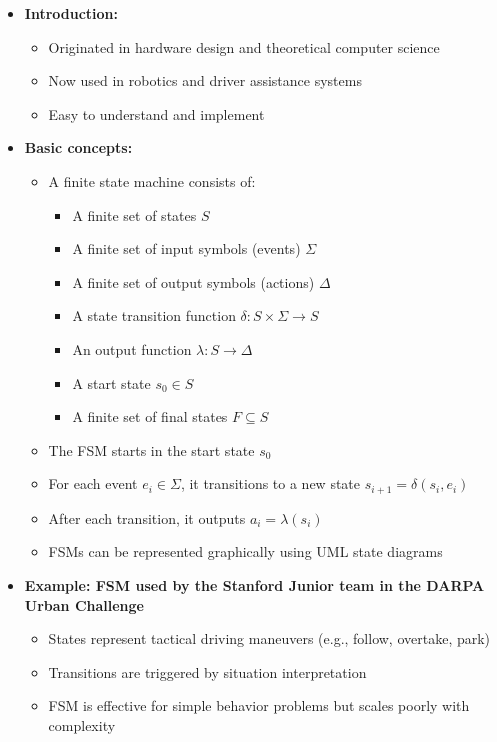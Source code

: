 \begin{itemize}
\item \textbf{Introduction:}
\begin{itemize}
    \item Originated in hardware design and theoretical computer science
    \item Now used in robotics and driver assistance systems
    \item Easy to understand and implement
\end{itemize}

\item \textbf{Basic concepts:}
\begin{itemize}
    \item A finite state machine consists of:
          \begin{itemize}
              \item A finite set of states $S$
              \item A finite set of input symbols (events) $\Sigma$
              \item A finite set of output symbols (actions) $\Delta$
              \item A state transition function $\delta:S \times \Sigma \to S$
              \item An output function $\lambda:S \to \Delta$
              \item A start state $s_0 \in S$
              \item A finite set of final states $F \subseteq S$
          \end{itemize}
    \item The FSM starts in the start state $s_0$
    \item For each event $e_i \in \Sigma$, it transitions to a new state $s_{i+1} = \delta(s_i, e_i)$
    \item After each transition, it outputs $a_i = \lambda(s_i)$
    \item FSMs can be represented graphically using UML state diagrams
\end{itemize}

\item \textbf{Example: FSM used by the Stanford Junior team in the DARPA Urban Challenge}
\begin{itemize}
    \item States represent tactical driving maneuvers (e.g., follow, overtake, park)
    \item Transitions are triggered by situation interpretation
    \item FSM is effective for simple behavior problems but scales poorly with complexity
\end{itemize}


\end{itemize}

